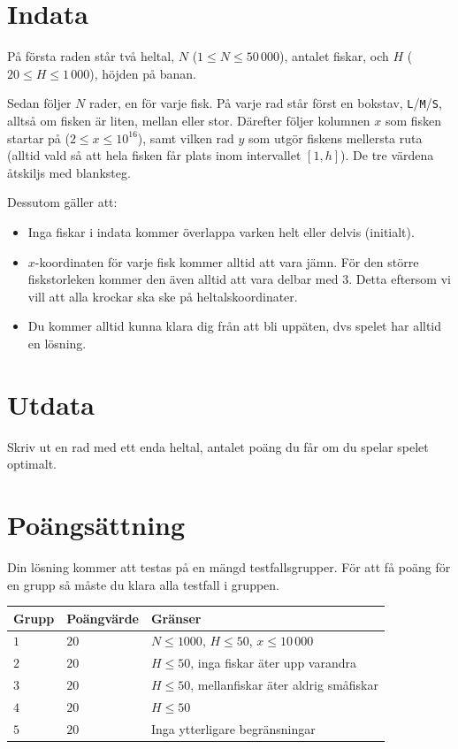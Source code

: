 \section*{Indata}

På första raden står två heltal, $N$ ($1 \leq N \leq 50\,000$), antalet fiskar, och $H$ ($20 \leq H \leq 1\,000$), höjden på banan. 

Sedan följer $N$ rader, en för varje fisk. På varje rad står först en bokstav, \texttt{L}/\texttt{M}/\texttt{S}, alltså om fisken är liten, mellan eller stor. Därefter följer kolumnen $x$ som fisken startar på ($2 \leq x \leq 10^{16}$), samt vilken rad $y$ som utgör fiskens mellersta ruta (alltid vald så att hela fisken får plats inom intervallet $[1, h]$). De tre värdena åtskiljs med blanksteg.

Dessutom gäller att:
\begin{itemize}
  \item
    Inga fiskar i indata kommer överlappa varken helt eller delvis (initialt).
  \item
      $x$-koordinaten för varje fisk kommer alltid att vara jämn. För den större
      fiskstorleken kommer den även alltid att vara delbar med 3. Detta
      eftersom vi vill att alla krockar ska ske på heltalskoordinater.
  \item
    Du kommer alltid kunna klara dig från att bli uppäten, dvs spelet har
    alltid en lösning.
\end{itemize}

\section*{Utdata}
Skriv ut en rad med ett enda heltal, antalet poäng du får om du spelar spelet optimalt.

\section*{Poängsättning}
Din lösning kommer att testas på en mängd testfallsgrupper.
För att få poäng för en grupp så måste du klara alla testfall i gruppen.

\noindent
\begin{tabular}{| l | l | l |}
  \hline
  Grupp & Poängvärde & Gränser \\ \hline
  $1$   & $20$       & $N \leq 1000$, $H \leq 50$, $x \leq 10\,000$ \\ \hline
  $2$   & $20$       & $H \leq 50$, inga fiskar äter upp varandra \\ \hline
  $3$   & $20$       & $H \leq 50$, mellanfiskar äter aldrig småfiskar \\ \hline
  $4$   & $20$       & $H \leq 50$ \\ \hline
  $5$   & $20$       & Inga ytterligare begränsningar \\ \hline
\end{tabular}

